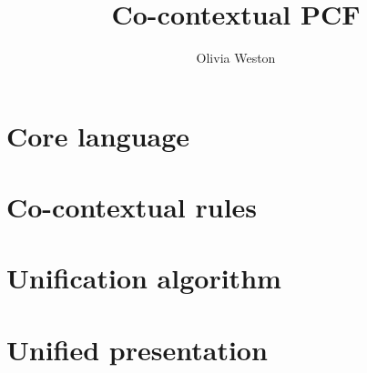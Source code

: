 \documentclass[draft]{article}
\title{Co-contextual PCF}
\author{Olivia Weston}
\begin{document}
\maketitle

\tableofcontents

\section{Core language}


\section{Co-contextual rules}


\section{Unification algorithm}


\section{Unified presentation}

\end{document}
